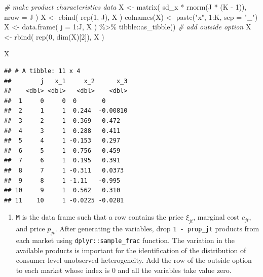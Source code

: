 \documentclass[
]{book}
\newenvironment{Shaded}{\begin{snugshade}}{\end{snugshade}}
\newcommand{\AttributeTok}[1]{\textcolor[rgb]{0.77,0.63,0.00}{#1}}
\newcommand{\CommentTok}[1]{\textcolor[rgb]{0.56,0.35,0.01}{\textit{#1}}}
\newcommand{\DecValTok}[1]{\textcolor[rgb]{0.00,0.00,0.81}{#1}}
\newcommand{\FunctionTok}[1]{\textcolor[rgb]{0.00,0.00,0.00}{#1}}
\newcommand{\NormalTok}[1]{#1}
\newcommand{\OtherTok}[1]{\textcolor[rgb]{0.56,0.35,0.01}{#1}}
\newcommand{\SpecialCharTok}[1]{\textcolor[rgb]{0.00,0.00,0.00}{#1}}
\newcommand{\StringTok}[1]{\textcolor[rgb]{0.31,0.60,0.02}{#1}}
\providecommand{\tightlist}{%
  \setlength{\itemsep}{0pt}\setlength{\parskip}{0pt}}
\begin{document}
\begin{Shaded}
\begin{Highlighting}[]
\CommentTok{\# make product characteristics data}
\NormalTok{X }\OtherTok{\textless{}{-}} 
  \FunctionTok{matrix}\NormalTok{(}
\NormalTok{    sd\_x }\SpecialCharTok{*} \FunctionTok{rnorm}\NormalTok{(J }\SpecialCharTok{*}\NormalTok{ (K }\SpecialCharTok{{-}} \DecValTok{1}\NormalTok{)), }
    \AttributeTok{nrow =}\NormalTok{ J}
\NormalTok{    )}
\NormalTok{X }\OtherTok{\textless{}{-}} 
  \FunctionTok{cbind}\NormalTok{(}
    \FunctionTok{rep}\NormalTok{(}\DecValTok{1}\NormalTok{, J), }
\NormalTok{    X}
\NormalTok{    )}
\FunctionTok{colnames}\NormalTok{(X) }\OtherTok{\textless{}{-}} \FunctionTok{paste}\NormalTok{(}\StringTok{"x"}\NormalTok{, }\DecValTok{1}\SpecialCharTok{:}\NormalTok{K, }\AttributeTok{sep =} \StringTok{"\_"}\NormalTok{)}
\NormalTok{X }\OtherTok{\textless{}{-}} 
  \FunctionTok{data.frame}\NormalTok{(}
    \AttributeTok{j =} \DecValTok{1}\SpecialCharTok{:}\NormalTok{J,}
\NormalTok{    X}
\NormalTok{    ) }\SpecialCharTok{\%\textgreater{}\%}
\NormalTok{  tibble}\SpecialCharTok{::}\FunctionTok{as\_tibble}\NormalTok{()}
\CommentTok{\# add outside option}
\NormalTok{X }\OtherTok{\textless{}{-}} 
  \FunctionTok{rbind}\NormalTok{(}
    \FunctionTok{rep}\NormalTok{(}\DecValTok{0}\NormalTok{, }\FunctionTok{dim}\NormalTok{(X)[}\DecValTok{2}\NormalTok{]),}
\NormalTok{    X}
\NormalTok{    ) }
\end{Highlighting}
\end{Shaded}

\begin{Shaded}
\begin{Highlighting}[]
\NormalTok{X}
\end{Highlighting}
\end{Shaded}

\begin{verbatim}
## # A tibble: 11 x 4
##        j   x_1     x_2      x_3
##    <dbl> <dbl>   <dbl>    <dbl>
##  1     0     0  0       0      
##  2     1     1  0.244  -0.00810
##  3     2     1  0.369   0.472  
##  4     3     1  0.288   0.411  
##  5     4     1 -0.153   0.297  
##  6     5     1  0.756   0.459  
##  7     6     1  0.195   0.391  
##  8     7     1 -0.311   0.0373 
##  9     8     1 -1.11   -0.995  
## 10     9     1  0.562   0.310  
## 11    10     1 -0.0225 -0.0281
\end{verbatim}

\begin{enumerate}
\def\labelenumi{\arabic{enumi}.}
\setcounter{enumi}{2}
\tightlist
\item
  \texttt{M} is the data frame such that a row contains the price \(\xi_{jt}\), marginal cost \(c_{jt}\), and price \(p_{jt}\). After generating the variables, drop \texttt{1\ -\ prop\_jt} products from each market using \texttt{dplyr::sample\_frac} function. The variation in the available products is important for the identification of the distribution of consumer-level unobserved heterogeneity. Add the row of the outside option to each market whose index is \(0\) and all the variables take value zero.
\end{enumerate}
\end{document}
